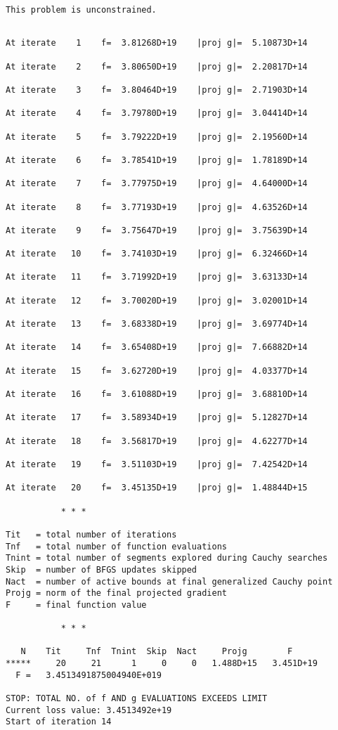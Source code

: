 \documentclass[11pt]{article}
\begin{document}
    \begin{Verbatim}[commandchars=\\\{\}]
 This problem is unconstrained.
    \end{Verbatim}

    \begin{Verbatim}[commandchars=\\\{\}]

At iterate    1    f=  3.81268D+19    |proj g|=  5.10873D+14

At iterate    2    f=  3.80650D+19    |proj g|=  2.20817D+14

At iterate    3    f=  3.80464D+19    |proj g|=  2.71903D+14

At iterate    4    f=  3.79780D+19    |proj g|=  3.04414D+14

At iterate    5    f=  3.79222D+19    |proj g|=  2.19560D+14

At iterate    6    f=  3.78541D+19    |proj g|=  1.78189D+14

At iterate    7    f=  3.77975D+19    |proj g|=  4.64000D+14

At iterate    8    f=  3.77193D+19    |proj g|=  4.63526D+14

At iterate    9    f=  3.75647D+19    |proj g|=  3.75639D+14

At iterate   10    f=  3.74103D+19    |proj g|=  6.32466D+14

At iterate   11    f=  3.71992D+19    |proj g|=  3.63133D+14

At iterate   12    f=  3.70020D+19    |proj g|=  3.02001D+14

At iterate   13    f=  3.68338D+19    |proj g|=  3.69774D+14

At iterate   14    f=  3.65408D+19    |proj g|=  7.66882D+14

At iterate   15    f=  3.62720D+19    |proj g|=  4.03377D+14

At iterate   16    f=  3.61088D+19    |proj g|=  3.68810D+14

At iterate   17    f=  3.58934D+19    |proj g|=  5.12827D+14

At iterate   18    f=  3.56817D+19    |proj g|=  4.62277D+14

At iterate   19    f=  3.51103D+19    |proj g|=  7.42542D+14

At iterate   20    f=  3.45135D+19    |proj g|=  1.48844D+15

           * * *

Tit   = total number of iterations
Tnf   = total number of function evaluations
Tnint = total number of segments explored during Cauchy searches
Skip  = number of BFGS updates skipped
Nact  = number of active bounds at final generalized Cauchy point
Projg = norm of the final projected gradient
F     = final function value

           * * *

   N    Tit     Tnf  Tnint  Skip  Nact     Projg        F
*****     20     21      1     0     0   1.488D+15   3.451D+19
  F =   3.4513491875004940E+019

STOP: TOTAL NO. of f AND g EVALUATIONS EXCEEDS LIMIT
Current loss value: 3.4513492e+19
Start of iteration 14
    \end{Verbatim}
\end{document}

